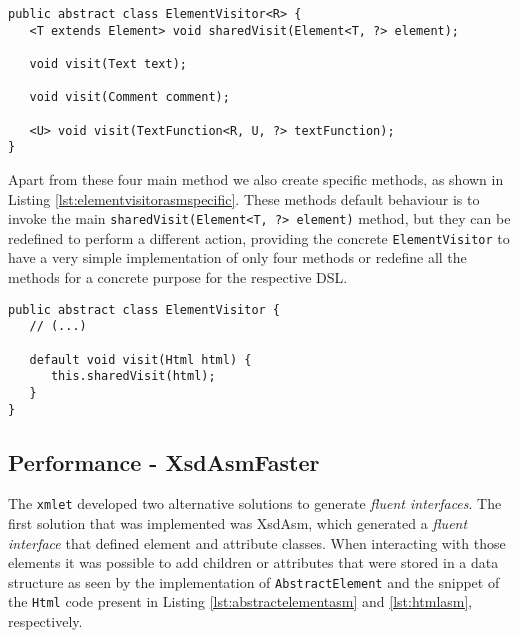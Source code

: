 \bigskip


\begin{minipage}{\linewidth}
\begin{lstlisting}[caption={ElementVisitor generated by XsdAsm - 1},label={lst:elementvisitorasm}]
public abstract class ElementVisitor<R> {
   <T extends Element> void sharedVisit(Element<T, ?> element);

   void visit(Text text);

   void visit(Comment comment);

   <U> void visit(TextFunction<R, U, ?> textFunction);
}
\end{lstlisting}
\end{minipage}

\noindent
Apart from these four main method we also create specific methods, as shown in Listing \ref{lst:elementvisitorasmspecific}. These methods default behaviour is to invoke the main \texttt{sharedVisit(Element<T, ?> element)} method, but they can be redefined to perform a different action, providing the concrete \texttt{ElementVisitor} to have a very simple implementation of only four methods or redefine all the methods for a concrete purpose for the respective \ac{DSL}.

\bigskip


\begin{minipage}{\linewidth}
\begin{lstlisting}[caption={ElementVisitor generated by XsdAsm - 2},label={lst:elementvisitorasmspecific}]
public abstract class ElementVisitor {
   // (...)

   default void visit(Html html) {
      this.sharedVisit(html);
   }
}
\end{lstlisting}
\end{minipage}

\subsection{Performance - XsdAsmFaster}
\label{sec:xsdasmfaster}

The \texttt{xmlet} developed two alternative solutions to generate \textit{fluent interfaces}. The first solution that was implemented was XsdAsm, which generated a \textit{fluent interface} that defined element and attribute classes. When interacting with those elements it was possible to add children or attributes that were stored in a data structure as seen by the implementation of \texttt{AbstractElement} and the snippet of the \texttt{Html} code present in Listing \ref{lst:abstractelementasm} and \ref{lst:htmlasm}, respectively.

